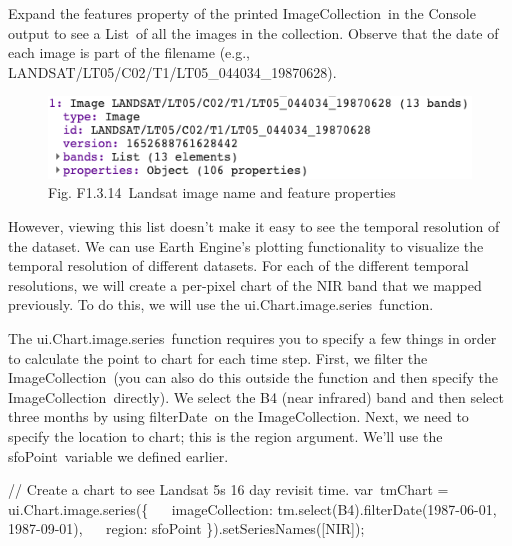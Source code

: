 \documentclass[
  letterpaper,
  DIV=11,
  numbers=noendperiod]{scrreprt}
\newenvironment{Shaded}{\begin{snugshade}}{\end{snugshade}}
\newcommand{\AttributeTok}[1]{\textcolor[rgb]{0.40,0.45,0.13}{#1}}
\newcommand{\CommentTok}[1]{\textcolor[rgb]{0.37,0.37,0.37}{#1}}
\newcommand{\DataTypeTok}[1]{\textcolor[rgb]{0.68,0.00,0.00}{#1}}
\newcommand{\FunctionTok}[1]{\textcolor[rgb]{0.28,0.35,0.67}{#1}}
\newcommand{\NormalTok}[1]{\textcolor[rgb]{0.00,0.23,0.31}{#1}}
\newcommand{\OperatorTok}[1]{\textcolor[rgb]{0.37,0.37,0.37}{#1}}
\newcommand{\StringTok}[1]{\textcolor[rgb]{0.13,0.47,0.30}{#1}}
\begin{document}
Expand the features property of the printed ImageCollection~in the
Console output to see a List~of all the images in the collection.
Observe that the date of each image is part of the filename (e.g.,
LANDSAT/LT05/C02/T1/LT05\_044034\_19870628).

\begin{figure}

{\centering \includegraphics{./F1/image3.png}

}

\caption{Fig. F1.3.14~Landsat image name and feature properties}

\end{figure}

However, viewing this list doesn't make it easy to see the temporal
resolution of the dataset. We can use Earth Engine's plotting
functionality to visualize the temporal resolution of different
datasets. For each of the different temporal resolutions, we will create
a per-pixel chart of the NIR band that we mapped previously. To do this,
we will use the ui.Chart.image.series~function.

The ui.Chart.image.series~function requires you to specify a few things
in order to calculate the point to chart for each time step. First, we
filter the ImageCollection~(you can also do this outside the function
and then specify the ImageCollection~directly). We select the B4 (near
infrared) band and then select three months by using filterDate~on the
ImageCollection. Next, we need to specify the location to chart; this is
the region argument. We'll use the sfoPoint~variable we defined earlier.

\begin{Shaded}
\begin{Highlighting}[]
\CommentTok{// Create a chart to see Landsat 5\textquotesingle{}s 16 day revisit time.  }
\NormalTok{var tmChart }\OperatorTok{=}\NormalTok{ ui}\OperatorTok{.}\AttributeTok{Chart}\OperatorTok{.}\AttributeTok{image}\OperatorTok{.}\FunctionTok{series}\NormalTok{(\{  }
  \DataTypeTok{ imageCollection}\OperatorTok{:}\NormalTok{ tm}\OperatorTok{.}\FunctionTok{select}\NormalTok{(}\StringTok{\textquotesingle{}B4\textquotesingle{}}\NormalTok{)}\OperatorTok{.}\FunctionTok{filterDate}\NormalTok{(}\StringTok{\textquotesingle{}1987{-}06{-}01\textquotesingle{}}\OperatorTok{,} \StringTok{\textquotesingle{}1987{-}09{-}01\textquotesingle{}}\NormalTok{)}\OperatorTok{,}  
  \DataTypeTok{ region}\OperatorTok{:}\NormalTok{ sfoPoint  }
\NormalTok{\})}\OperatorTok{.}\FunctionTok{setSeriesNames}\NormalTok{([}\StringTok{\textquotesingle{}NIR\textquotesingle{}}\NormalTok{])}\OperatorTok{;}
\end{Highlighting}
\end{Shaded}
\end{document}
